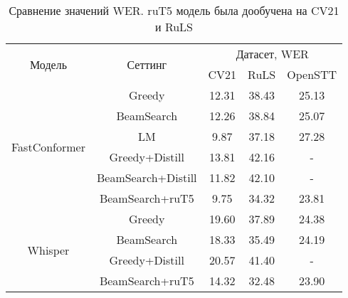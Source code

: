 \begin{table}[]
\centering
\caption{Сравнение значений WER. ruT5 модель была дообучена на CV21 и RuLS}
\begin{tabular}{|c|c|ccc|}
\hline
\multirow{2}{*}{Модель}        & \multirow{2}{*}{Сеттинг}             & \multicolumn{3}{c|}{Датасет, WER}                                    \\ \cline{3-5} 
                               &                                      & \multicolumn{1}{c|}{CV21}  & \multicolumn{1}{c|}{RuLS}     & OpenSTT \\ \hline
\multirow{6}{*}{FastConformer} & Greedy                               & \multicolumn{1}{c|}{12.31} & \multicolumn{1}{c|}{38.43}    & 25.13   \\ \cline{2-5} 
                               & BeamSearch                           & \multicolumn{1}{c|}{12.26} & \multicolumn{1}{c|}{38.84}    & 25.07   \\ \cline{2-5} 
                               & LM                                   & \multicolumn{1}{c|}{9.87}  & \multicolumn{1}{c|}{37.18}    & 27.28   \\ \cline{2-5} 
                               & Greedy+Distill                       & \multicolumn{1}{c|}{13.81} & \multicolumn{1}{c|}{42.16}    & -       \\ \cline{2-5} 
                               & BeamSearch+Distill                   & \multicolumn{1}{c|}{11.82} & \multicolumn{1}{c|}{42.10}    & -       \\ \cline{2-5} 
                               & BeamSearch+ruT5                      & \multicolumn{1}{c|}{9.75}  & \multicolumn{1}{c|}{34.32}    & 23.81   \\ \hline
\multirow{4}{*}{Whisper}       & Greedy                               & \multicolumn{1}{c|}{19.60} & \multicolumn{1}{c|}{37.89}    & 24.38   \\ \cline{2-5} 
                               & BeamSearch                           & \multicolumn{1}{c|}{18.33} & \multicolumn{1}{c|}{35.49}    & 24.19   \\ \cline{2-5} 
                               & Greedy+Distill                       & \multicolumn{1}{c|}{20.57} & \multicolumn{1}{c|}{41.40}    & -       \\ \cline{2-5} 
                               & BeamSearch+ruT5                      & \multicolumn{1}{c|}{14.32} & \multicolumn{1}{c|}{32.48}    & 23.90   \\ \hline
\end{tabular}
\label{tab:res_full}
\end{table}

